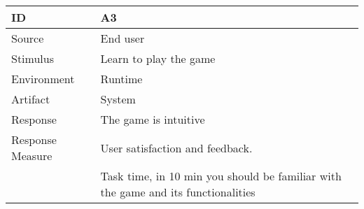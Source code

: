 \begin{center}
	\begin{tabular}{ | l | p{12cm} |}
	\hline
	ID & A3 \\ \hline
	Source & End user \\ \hline
	Stimulus & Learn to play the game \\ \hline
	Environment & Runtime \\ \hline
	Artifact & System \\ \hline
	Response & The game is intuitive \\ \hline
	Response Measure & 	User satisfaction and feedback. \\
					&	Task time, in 10 min you should be familiar with the game and its functionalities \\ \hline
	\hline
	\end{tabular}
\end{center}


	

  

